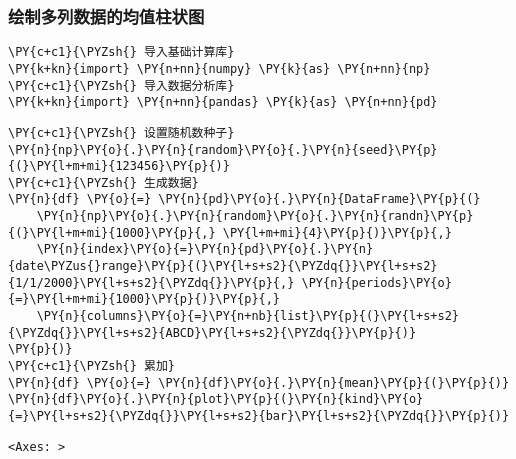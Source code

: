     \hypertarget{ux7ed8ux5236ux591aux5217ux6570ux636eux7684ux5747ux503cux67f1ux72b6ux56fe}{%
\subsubsection{绘制多列数据的均值柱状图}\label{ux7ed8ux5236ux591aux5217ux6570ux636eux7684ux5747ux503cux67f1ux72b6ux56fe}}

    \begin{tcolorbox}[breakable, size=fbox, boxrule=1pt, pad at break*=1mm,colback=cellbackground, colframe=cellborder]
\begin{Verbatim}[commandchars=\\\{\}]
\PY{c+c1}{\PYZsh{} 导入基础计算库}
\PY{k+kn}{import} \PY{n+nn}{numpy} \PY{k}{as} \PY{n+nn}{np}
\PY{c+c1}{\PYZsh{} 导入数据分析库}
\PY{k+kn}{import} \PY{n+nn}{pandas} \PY{k}{as} \PY{n+nn}{pd}
\end{Verbatim}
\end{tcolorbox}

    \begin{tcolorbox}[breakable, size=fbox, boxrule=1pt, pad at break*=1mm,colback=cellbackground, colframe=cellborder]
\begin{Verbatim}[commandchars=\\\{\}]
\PY{c+c1}{\PYZsh{} 设置随机数种子}
\PY{n}{np}\PY{o}{.}\PY{n}{random}\PY{o}{.}\PY{n}{seed}\PY{p}{(}\PY{l+m+mi}{123456}\PY{p}{)}
\PY{c+c1}{\PYZsh{} 生成数据}
\PY{n}{df} \PY{o}{=} \PY{n}{pd}\PY{o}{.}\PY{n}{DataFrame}\PY{p}{(}
    \PY{n}{np}\PY{o}{.}\PY{n}{random}\PY{o}{.}\PY{n}{randn}\PY{p}{(}\PY{l+m+mi}{1000}\PY{p}{,} \PY{l+m+mi}{4}\PY{p}{)}\PY{p}{,} 
    \PY{n}{index}\PY{o}{=}\PY{n}{pd}\PY{o}{.}\PY{n}{date\PYZus{}range}\PY{p}{(}\PY{l+s+s2}{\PYZdq{}}\PY{l+s+s2}{1/1/2000}\PY{l+s+s2}{\PYZdq{}}\PY{p}{,} \PY{n}{periods}\PY{o}{=}\PY{l+m+mi}{1000}\PY{p}{)}\PY{p}{,}
    \PY{n}{columns}\PY{o}{=}\PY{n+nb}{list}\PY{p}{(}\PY{l+s+s2}{\PYZdq{}}\PY{l+s+s2}{ABCD}\PY{l+s+s2}{\PYZdq{}}\PY{p}{)}
\PY{p}{)}
\PY{c+c1}{\PYZsh{} 累加}
\PY{n}{df} \PY{o}{=} \PY{n}{df}\PY{o}{.}\PY{n}{mean}\PY{p}{(}\PY{p}{)}
\PY{n}{df}\PY{o}{.}\PY{n}{plot}\PY{p}{(}\PY{n}{kind}\PY{o}{=}\PY{l+s+s2}{\PYZdq{}}\PY{l+s+s2}{bar}\PY{l+s+s2}{\PYZdq{}}\PY{p}{)}
\end{Verbatim}
\end{tcolorbox}

            \begin{tcolorbox}[breakable, size=fbox, boxrule=.5pt, pad at break*=1mm, opacityfill=0]
\begin{Verbatim}[commandchars=\\\{\}]
<Axes: >
\end{Verbatim}
\end{tcolorbox}
        
    \begin{center}
    \end{center}
    { \hspace*{\fill} \\}
